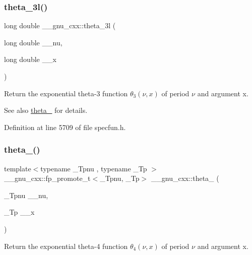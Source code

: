 \subsubsection{\texorpdfstring{theta\+\_\+3l()}{theta\_3l()}}
{\footnotesize\ttfamily long double \+\_\+\+\_\+gnu\+\_\+cxx\+::theta\+\_\+3l (\begin{DoxyParamCaption}\item[{long double}]{\+\_\+\+\_\+nu,  }\item[{long double}]{\+\_\+\+\_\+x }\end{DoxyParamCaption})\hspace{0.3cm}{\ttfamily [inline]}}

Return the exponential theta-\/3 function $ \theta_3(\nu,x) $ of period $ \nu $ and argument {\ttfamily x}.

\begin{DoxySeeAlso}{See also}
\hyperlink{group__mathsf__gnu_ga146c3b8e86991e164d4bf143cda5f0fc}{theta\+\_} for details. 
\end{DoxySeeAlso}


Definition at line 5709 of file specfun.\+h.

\mbox{\label{group__mathsf__gnu_ga8a6f8b69272a9f205a13e1745832ada3}} 
\subsubsection{\texorpdfstring{theta\+\_()}{theta\_4()}}
{\footnotesize\ttfamily template$<$typename \+\_\+\+Tpnu , typename \+\_\+\+Tp $>$ \\
\+\_\+\+\_\+gnu\+\_\+cxx\+::fp\+\_\+promote\+\_\+t$<$\+\_\+\+Tpnu, \+\_\+\+Tp$>$ \+\_\+\+\_\+gnu\+\_\+cxx\+::theta\+\_ (\begin{DoxyParamCaption}\item[{\+\_\+\+Tpnu}]{\+\_\+\+\_\+nu,  }\item[{\+\_\+\+Tp}]{\+\_\+\+\_\+x }\end{DoxyParamCaption})\hspace{0.3cm}{\ttfamily [inline]}}

Return the exponential theta-\/4 function $ \theta_4(\nu,x) $ of period $ \nu $ and argument {\ttfamily x}.

